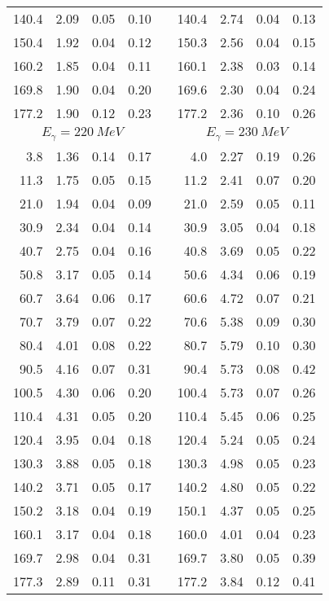 \begin{table}[htbp]
\begin{center}
\begin{tabular}{|r|r|c|c|l|r|r|c|c|}
140.4 &  2.09 &  0.05 &  0.10 & & 140.4 &  2.74 &  0.04 &  0.13 \\ 
150.4 &  1.92 &  0.04 &  0.12 & & 150.3 &  2.56 &  0.04 &  0.15 \\ 
160.2 &  1.85 &  0.04 &  0.11 & & 160.1 &  2.38 &  0.03 &  0.14 \\ 
169.8 &  1.90 &  0.04 &  0.20 & & 169.6 &  2.30 &  0.04 &  0.24 \\ 
177.2 &  1.90 &  0.12 &  0.23 & & 177.2 &  2.36 &  0.10 &  0.26 \\ 
\hline 
\hline 
\multicolumn{4}{|c|}{ $E_{\gamma}=220~MeV$} & & 
\multicolumn{4}{c|}{ $E_{\gamma}=230~MeV$} \\ 
\cline{1-4} 
\cline{6-9} 
  3.8 &  1.36 &  0.14 &  0.17 & &   4.0 &  2.27 &  0.19 &  0.26 \\ 
 11.3 &  1.75 &  0.05 &  0.15 & &  11.2 &  2.41 &  0.07 &  0.20 \\ 
 21.0 &  1.94 &  0.04 &  0.09 & &  21.0 &  2.59 &  0.05 &  0.11 \\ 
 30.9 &  2.34 &  0.04 &  0.14 & &  30.9 &  3.05 &  0.04 &  0.18 \\ 
 40.7 &  2.75 &  0.04 &  0.16 & &  40.8 &  3.69 &  0.05 &  0.22 \\ 
 50.8 &  3.17 &  0.05 &  0.14 & &  50.6 &  4.34 &  0.06 &  0.19 \\ 
 60.7 &  3.64 &  0.06 &  0.17 & &  60.6 &  4.72 &  0.07 &  0.21 \\ 
 70.7 &  3.79 &  0.07 &  0.22 & &  70.6 &  5.38 &  0.09 &  0.30 \\ 
 80.4 &  4.01 &  0.08 &  0.22 & &  80.7 &  5.79 &  0.10 &  0.30 \\ 
 90.5 &  4.16 &  0.07 &  0.31 & &  90.4 &  5.73 &  0.08 &  0.42 \\ 
100.5 &  4.30 &  0.06 &  0.20 & & 100.4 &  5.73 &  0.07 &  0.26 \\ 
110.4 &  4.31 &  0.05 &  0.20 & & 110.4 &  5.45 &  0.06 &  0.25 \\ 
120.4 &  3.95 &  0.04 &  0.18 & & 120.4 &  5.24 &  0.05 &  0.24 \\ 
130.3 &  3.88 &  0.05 &  0.18 & & 130.3 &  4.98 &  0.05 &  0.23 \\ 
140.2 &  3.71 &  0.05 &  0.17 & & 140.2 &  4.80 &  0.05 &  0.22 \\ 
150.2 &  3.18 &  0.04 &  0.19 & & 150.1 &  4.37 &  0.05 &  0.25 \\ 
160.1 &  3.17 &  0.04 &  0.18 & & 160.0 &  4.01 &  0.04 &  0.23 \\ 
169.7 &  2.98 &  0.04 &  0.31 & & 169.7 &  3.80 &  0.05 &  0.39 \\ 
177.3 &  2.89 &  0.11 &  0.31 & & 177.2 &  3.84 &  0.12 &  0.41 \\ 
\cline{1-4} 
\cline{6-9} 
\end{tabular} 

\end{center} 
\end{table}

